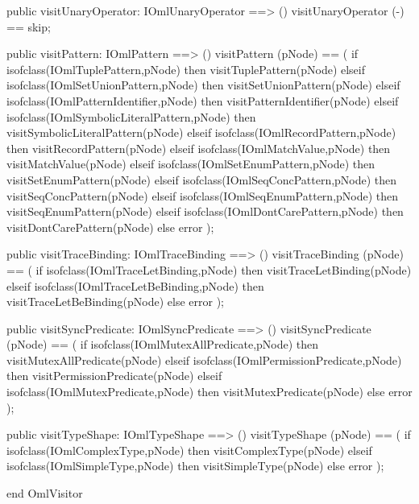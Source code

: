 \begin{vdm_al}
  public visitUnaryOperator: IOmlUnaryOperator ==> ()
  visitUnaryOperator (-) == skip;

  public visitPattern: IOmlPattern ==> ()
  visitPattern (pNode) ==
    ( if isofclass(IOmlTuplePattern,pNode) then visitTuplePattern(pNode)
      elseif isofclass(IOmlSetUnionPattern,pNode) then visitSetUnionPattern(pNode)
      elseif isofclass(IOmlPatternIdentifier,pNode) then visitPatternIdentifier(pNode)
      elseif isofclass(IOmlSymbolicLiteralPattern,pNode) then visitSymbolicLiteralPattern(pNode)
      elseif isofclass(IOmlRecordPattern,pNode) then visitRecordPattern(pNode)
      elseif isofclass(IOmlMatchValue,pNode) then visitMatchValue(pNode)
      elseif isofclass(IOmlSetEnumPattern,pNode) then visitSetEnumPattern(pNode)
      elseif isofclass(IOmlSeqConcPattern,pNode) then visitSeqConcPattern(pNode)
      elseif isofclass(IOmlSeqEnumPattern,pNode) then visitSeqEnumPattern(pNode)
      elseif isofclass(IOmlDontCarePattern,pNode) then visitDontCarePattern(pNode)
      else error );

  public visitTraceBinding: IOmlTraceBinding ==> ()
  visitTraceBinding (pNode) ==
    ( if isofclass(IOmlTraceLetBinding,pNode) then visitTraceLetBinding(pNode)
      elseif isofclass(IOmlTraceLetBeBinding,pNode) then visitTraceLetBeBinding(pNode)
      else error );

  public visitSyncPredicate: IOmlSyncPredicate ==> ()
  visitSyncPredicate (pNode) ==
    ( if isofclass(IOmlMutexAllPredicate,pNode) then visitMutexAllPredicate(pNode)
      elseif isofclass(IOmlPermissionPredicate,pNode) then visitPermissionPredicate(pNode)
      elseif isofclass(IOmlMutexPredicate,pNode) then visitMutexPredicate(pNode)
      else error );

  public visitTypeShape: IOmlTypeShape ==> ()
  visitTypeShape (pNode) ==
    ( if isofclass(IOmlComplexType,pNode) then visitComplexType(pNode)
      elseif isofclass(IOmlSimpleType,pNode) then visitSimpleType(pNode)
      else error );

end OmlVisitor
\end{vdm_al}
